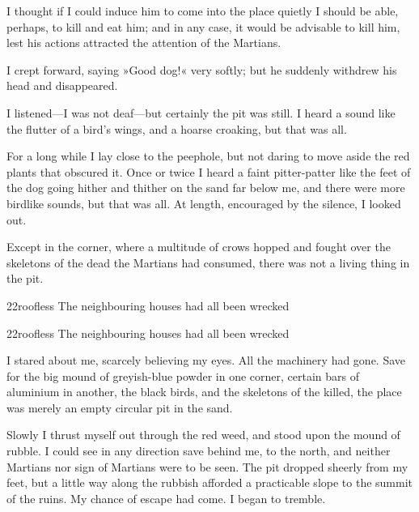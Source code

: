 I thought if I could induce him to come into the place quietly I should be able, perhaps, to kill and eat him; and in any case, it would be advisable to kill him, lest his actions attracted the attention of the Martians.

I crept forward, saying »Good dog!« very softly; but he suddenly withdrew his head and disappeared.

I listened—I was not deaf—but certainly the pit was still. I heard a sound like the flutter of a bird's wings, and a hoarse croaking, but that was all.

For a long while I lay close to the peephole, but not daring to move aside the red plants that obscured it. Once or twice I heard a faint pitter-patter like the feet of the dog going hither and thither on the sand far below me, and there were more birdlike sounds, but that was all. At length, encouraged by the silence, I looked out.

Except in the corner, where a multitude of crows hopped and fought over the skeletons of the dead the Martians had consumed, there was not a living thing in the pit.


\begin{letter}
	\begin{bwbigpic}
		[1.2] 
		{22roofless} 
		{The neighbouring houses had all been wrecked} 
	\end{bwbigpic}
\end{letter}

\begin{a4}
	\begin{bwbigpic}
		[1.1] 
		{22roofless} 
		{The neighbouring houses had all been wrecked} 
	\end{bwbigpic}
\end{a4}

I stared about me, scarcely believing my eyes. All the machinery had gone. Save for the big mound of greyish-blue powder in one corner, certain bars of aluminium in another, the black birds, and the skeletons of the killed, the place was merely an empty circular pit in the sand.

Slowly I thrust myself out through the red weed, and stood upon the mound of rubble. I could see in any direction save behind me, to the north, and neither Martians nor sign of Martians were to be seen. The pit dropped sheerly from my feet, but a little way along the rubbish afforded a practicable slope to the summit of the ruins. My chance of escape had come. I began to tremble.

